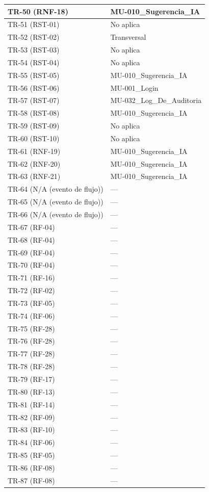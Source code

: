 \documentclass[
]{article}
\begin{document}
{\begin{longtable}[]{|
  >{\centering\arraybackslash}p{}|
  >{\raggedright\arraybackslash}p{}|}
\hline
TR-50 (RNF-18) & MU-010\_Sugerencia\_IA \\
\hline
TR-51 (RST-01) & No aplica \\
\hline
TR-52 (RST-02) & Transversal \\
\hline
TR-53 (RST-03) & No aplica \\
\hline
TR-54 (RST-04) & No aplica \\
\hline
TR-55 (RST-05) & MU-010\_Sugerencia\_IA \\
\hline
TR-56 (RST-06) & MU-001\_Login \\
\hline
TR-57 (RST-07) & MU-032\_Log\_De\_Auditoria \\
\hline
TR-58 (RST-08) & MU-010\_Sugerencia\_IA \\
\hline
TR-59 (RST-09) & No aplica \\
\hline
TR-60 (RST-10) & No aplica \\
\hline
TR-61 (RNF-19) & MU-010\_Sugerencia\_IA \\
\hline
TR-62 (RNF-20) & MU-010\_Sugerencia\_IA \\
\hline
TR-63 (RNF-21) & MU-010\_Sugerencia\_IA \\
\hline
TR-64 (N/A (evento de flujo)) & — \\
\hline
TR-65 (N/A (evento de flujo)) & — \\
\hline
TR-66 (N/A (evento de flujo)) & — \\
\hline
TR-67 (RF-04) & — \\
\hline
TR-68 (RF-04) & — \\
\hline
TR-69 (RF-04) & — \\
\hline
TR-70 (RF-04) & — \\
\hline
TR-71 (RF-16) & — \\
\hline
TR-72 (RF-02) & — \\
\hline
TR-73 (RF-05) & — \\
\hline
TR-74 (RF-06) & — \\
\hline
TR-75 (RF-28) & — \\
\hline
TR-76 (RF-28) & — \\
\hline
TR-77 (RF-28) & — \\
\hline
TR-78 (RF-28) & — \\
\hline
TR-79 (RF-17) & — \\
\hline
TR-80 (RF-13) & — \\
\hline
TR-81 (RF-14) & — \\
\hline
TR-82 (RF-09) & — \\
\hline
TR-83 (RF-10) & — \\
\hline
TR-84 (RF-06) & — \\
\hline
TR-85 (RF-05) & — \\
\hline
TR-86 (RF-08) & — \\
\hline
TR-87 (RF-08) & — \\
\hline
\end{longtable}
}
\end{document}
